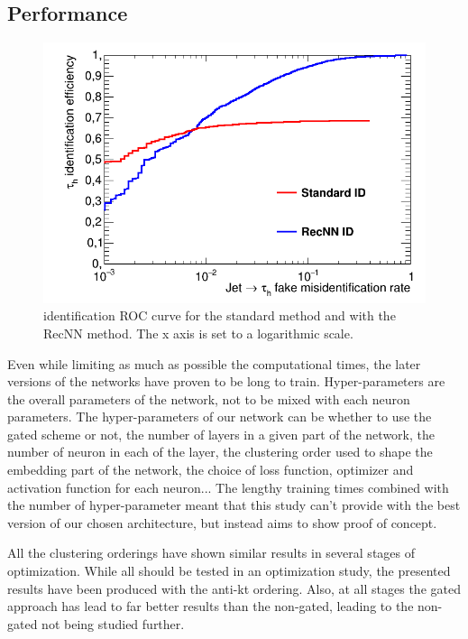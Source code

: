 \subsection{Performance}

\begin{figure}
    \centering
    \includegraphics[width=\textwidth]{Images/ROC_comp.png}
    \caption{\tauh identification ROC curve for the standard method and with the RecNN method. The x axis is set to a logarithmic scale.}
    \label{fig:RecNN_ROC}
\end{figure}

Even while limiting as much as possible the computational times, the later versions of the networks have proven to be long to train. Hyper-parameters are the overall parameters of the network, not to be mixed with each neuron parameters. The hyper-parameters of our network can be whether to use the gated scheme or not, the number of layers in a given part of the network, the number of neuron in each of the layer, the clustering order used to shape the embedding part of the network, the choice of loss function, optimizer and activation function for each neuron... The lengthy training times combined with the number of hyper-parameter meant that this study can't provide with the best version of our chosen architecture, but instead aims to show proof of concept.

All the clustering orderings have shown similar results in several stages of optimization. While all should be tested in an optimization study, the presented results have been produced with the anti-kt ordering. Also, at all stages the gated approach has lead to far better results than the non-gated, leading to the non-gated not being studied further.

